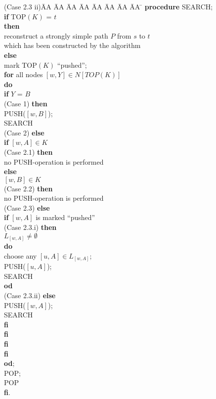 \documentclass[12pt,twoside,a4paper]{article}
\begin{document}
\begin{tabbing}
(Case 2.3 ii)\= AA \= AA \= AA \= AA \= AA \= AA \= AA \= AA \= \kill \> {\bf procedure} SEARCH; \\
\> {\bf if} TOP$(K)$ = $t$ \\
\> {\bf then} \\
\> \> reconstruct a strongly simple path $P$ from $s$ to $t$ \\ 
\> \> which has been constructed by the algorithm \\
\> {\bf else} \\ 
\> \> mark TOP$(K)$ ``pushed''; \\
\> \> {\bf for} all nodes $[w,Y]\in N[TOP(K)]$ \\
\> \> {\bf do} \\
\> \> \> {\bf if} $Y$ = $B$ \\
(Case 1) \> \> \> {\bf then} \\
\> \> \> \> PUSH($[w,B]$); \\
\> \> \> \> SEARCH \\
(Case 2) \> \> \> {\bf else} \\
\> \> \> \> {\bf if} $[w,A]\in K$ \\
(Case 2.1) \> \> \> \> {\bf then} \\
\> \> \> \> \> no PUSH-operation is performed \\
\> \> \> \> {\bf else} \\
\> \> \> \>  $[w,B]\in K$ \\
(Case 2.2) \> \> \> \> \> {\bf then} \\
\> \> \> \> \> \>no PUSH-operation is performed \\
(Case 2.3) \> \> \> \> \> {\bf else} \\
\> \> \> \> \> \> {\bf if} $[w,A]$ is marked ``pushed''  \\
(Case 2.3.i) \> \> \> \> \> \> {\bf then} \\
\> \> \> \> \> \>  $L_{[w,A]} \not= \emptyset$  \\
\> \> \> \> \> \> \> {\bf do} \\
\> \> \> \> \> \> \> \> choose any $[u,A]\in L_{[w,A]}$; \\
\> \> \> \> \> \> \> \> PUSH($[u,A]$); \\
\> \> \> \> \> \> \> \> SEARCH \\
\> \> \> \> \> \> \> {\bf od} \\
(Case 2.3.ii)\> \> \> \> \> \> {\bf else} \\
\> \> \> \> \> \> \> PUSH($[w,A]$); \\
\> \> \> \> \> \> \> SEARCH \\
\> \> \> \> \> \> {\bf fi} \\
\> \> \> \> \> {\bf fi} \\
\> \> \> \> {\bf fi} \\
\> \> \> {\bf fi} \\
\> \> {\bf od};\\
\> \> POP; \\
\> \> POP \\
\> {\bf fi}.
\end{tabbing}
\end{document}
